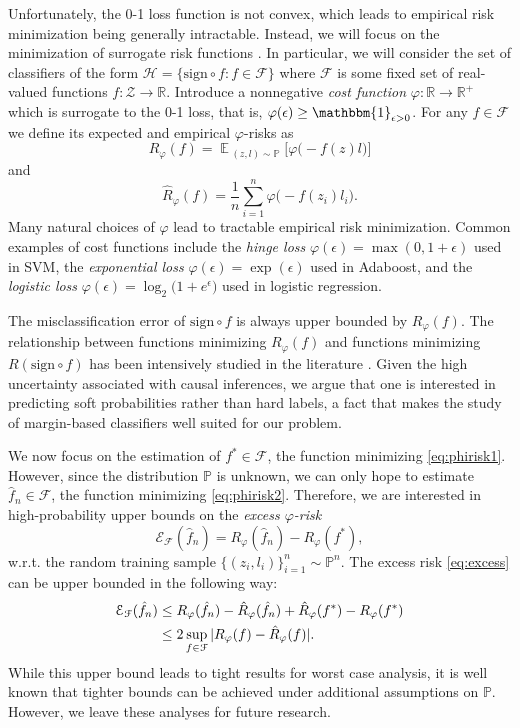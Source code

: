 \documentclass{article}
\DeclareMathOperator*{\E}{\mathbb{E}\,}
\newcommand{\F}{\mathcal{F}}
\newcommand{\Z}{\mathcal{Z}}
\newcommand{\Ex}{\mathcal{E}}
\newcommand{\sig}{\mathrm{sign}\circ\!}
\newcommand{\Hyp}{\mathcal{H}}
\newcommand{\Pio}{\mathbb{P}}
\newcommand{\R}{\mathbb{R}}
\newcommand{\Rp}{R_{\varphi}}
\newcommand{\Rpn}{\hat{R}_{\varphi}}
\newcommand{\f}{f^*}
\newcommand{\fn}{\hat{f}_n}
\begin{document}
Unfortunately, the 0-1 loss function is not convex, which leads to empirical
risk minimization being generally intractable.  Instead, we will focus on the
minimization of surrogate risk functions \cite{BJM06}.  In particular, we will
consider the set of classifiers of the form $\Hyp = \{{\sig f}\colon
{f\in\F}\}$ where $\F$ is some fixed set of real-valued functions ${f\colon
\Z\to\R}$.  Introduce a nonnegative \emph{cost function} $\varphi\colon
\R\to\R^+$ which is surrogate to the 0-1 loss, that is, $\varphi(\epsilon) \geq
\mathbbm{1}_{\epsilon>0}$.  For any $f\in \F$ we define its expected and
empirical $\varphi$-risks as
\begin{equation}\label{eq:phirisk1}
  \Rp(f) = \E_{(z,l)\sim \Pio}\bigl[\varphi\bigl(-f(z) l\bigr)\bigr]
\end{equation}
and
\begin{equation}\label{eq:phirisk2}
  \Rpn(f) = \frac{1}{n}\sum_{i=1}^n \varphi\bigl(-f(z_i) l_i\bigr).
\end{equation}
Many natural choices of $\varphi$ lead to tractable empirical risk
minimization.  Common examples of cost functions include the \emph{hinge loss}
$\varphi(\epsilon)=\max(0,1+\epsilon)$ used in SVM, the \emph{exponential loss}
$\varphi(\epsilon)=\exp(\epsilon)$ used in Adaboost, and the \emph{logistic
loss} $\varphi(\epsilon)=\log_2\bigl(1+e^\epsilon)$ used in logistic
regression.

The misclassification error of $\sig f$ is always upper bounded by $\Rp(f)$.
The relationship between functions minimizing $\Rp(f)$ and functions minimizing
${R(\sig f)}$ has been intensively studied in the literature \citep[Chapter
3]{Steinwart08}.  Given the high uncertainty associated with causal inferences,
we argue that one is interested in predicting soft probabilities rather than
hard labels, a fact that makes the study of margin-based classifiers well
suited for our problem.

We now focus on the estimation of $f^*\in\F$, the function minimizing
\eqref{eq:phirisk1}.  However, since the distribution $\Pio$ is unknown, we can
only hope to estimate $\hat{f}_n\in\F$, the function minimizing
\eqref{eq:phirisk2}.  Therefore, we are interested in high-probability upper
bounds on the
\emph{excess $\varphi$-risk}
\begin{equation}
\label{eq:excess}
\Ex_{\F}(\fn) =
\Rp(\fn) - \Rp(\f),
\end{equation}
w.r.t. the random training sample $\{(z_i,l_i)\}_{i=1}^n \sim \Pio^n$.  
The excess risk \eqref{eq:excess} can be upper bounded in the following way:
\begin{align}
\Ex_{\F}(\fn)
\notag
&\leq
\Rp(\fn) - \Rpn(\fn)
+
\Rpn(\f) - \Rp(\f)\\
\label{eq:SLT-Bad}
&\leq
2\sup_{f\in\F}|\Rp(f) - \Rpn(f)|.
\end{align}
While this upper bound leads to tight results for worst case analysis, it is
well known \cite{BBM05,BBL05,K11} that tighter bounds can be achieved under
additional assumptions on $\Pio$.  However, we leave these analyses for future
research.
\end{document}
